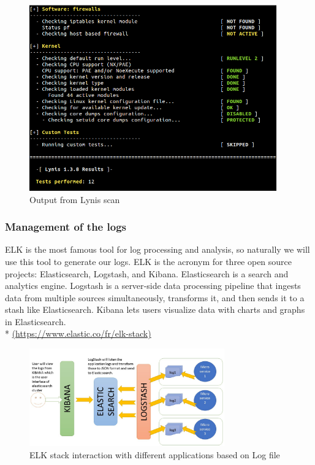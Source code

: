 \begin{figure}[!h]
  \centering
  \includegraphics[width=0.95\textwidth]{images/lynis-example.png}
  \caption{Output from Lynis scan}
  \label{Lynis}
\end{figure}

\pagebreak

\subsubsection{Management of the logs}

ELK is the most famous tool for log processing and analysis, so naturally we will use this tool to generate our logs.
ELK is the acronym for three open source projects:
Elasticsearch, Logstash, and Kibana. Elasticsearch is a search and
analytics engine. Logstash is a server‑side data processing pipeline
that ingests data from multiple sources simultaneously, transforms it,
and then sends it to a stash like Elasticsearch. Kibana lets
users visualize data with charts and graphs in Elasticsearch.\\ *
\url{(https://www.elastic.co/fr/elk-stack)}\\


\begin{figure}[!h]
  \centering
  \includegraphics[width=0.75\textwidth]{images/elk-example.png}
  \caption{ELK stack interaction with different applications based on Log file}
  \label{ELK}
\end{figure}


